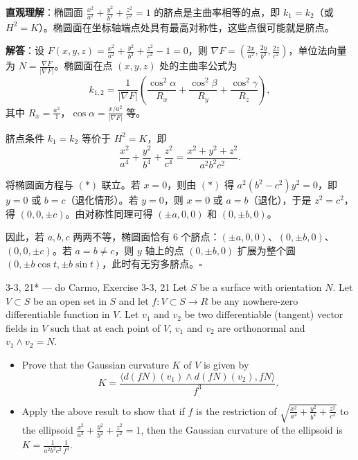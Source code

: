 \begin{solution}
\textbf{直观理解}：椭圆面 $\frac{x^2}{a^2}+\frac{y^2}{b^2}+\frac{z^2}{c^2}=1$ 的脐点是主曲率相等的点，即 $k_1=k_2$（或 $H^2=K$）。椭圆面在坐标轴端点处具有最高对称性，这些点很可能就是脐点。

\textbf{解答}：设 $F(x,y,z)=\frac{x^2}{a^2}+\frac{y^2}{b^2}+\frac{z^2}{c^2}-1=0$，则 $\nabla F=(\frac{2x}{a^2},\frac{2y}{b^2},\frac{2z}{c^2})$，单位法向量为 $N=\frac{\nabla F}{|\nabla F|}$。椭圆面在点 $(x,y,z)$ 处的主曲率公式为
\[
k_{1,2}=\frac{1}{|\nabla F|}\left(\frac{\cos^2\alpha}{R_x}+\frac{\cos^2\beta}{R_y}+\frac{\cos^2\gamma}{R_z}\right),
\]
其中 $R_x=\frac{a^2}{1}$，$\cos\alpha=\frac{x/a^2}{|\nabla F|}$ 等。

脐点条件 $k_1=k_2$ 等价于 $H^2=K$，即
\[
\frac{x^2}{a^4}+\frac{y^2}{b^4}+\frac{z^2}{c^4}=\frac{x^2+y^2+z^2}{a^2b^2c^2}. \tag{$*$}
\]

将椭圆面方程与 $(*)$ 联立。若 $x=0$，则由 $(*)$ 得 $a^2(b^2-c^2)y^2=0$，即 $y=0$ 或 $b=c$（退化情形）。若 $y=0$，则 $x=0$ 或 $a=b$（退化），于是 $z^2=c^2$，得 $(0,0,\pm c)$。由对称性同理可得 $(\pm a,0,0)$ 和 $(0,\pm b,0)$。

因此，若 $a,b,c$ 两两不等，椭圆面恰有 6 个脐点：$(\pm a,0,0)$、$(0,\pm b,0)$、$(0,0,\pm c)$。若 $a=b\neq c$，则 $y$ 轴上的点 $(0,\pm b,0)$ 扩展为整个圆 $(0,\pm b\cos t, \pm b\sin t)$，此时有无穷多脐点。$\square$
\end{solution}

\begin{exercise}{3-3, 21* — do Carmo, Exercise 3-3, 21}
Let $S$ be a surface with orientation $N$. Let $V \subset S$ be an open set in $S$ and let $f \colon V \subset S \to R$ be any nowhere-zero differentiable function in $V$. Let $v_{1}$ and $v_{2}$ be two differentiable (tangent) vector fields in $V$ such that at each point of $V$, $v_{1}$ and $v_{2}$ are orthonormal and $v_{1} \wedge v_{2} = N$.
\begin{itemize}
\item[a.] Prove that the Gaussian curvature $K$ of $V$ is given by
\[
K = \frac {\langle d (f N) (v _ {1}) \wedge d (f N) (v _ {2}) , f N \rangle}{f ^ {3}}.
\]
\item[b.] Apply the above result to show that if $f$ is the restriction of $\sqrt {\frac {x ^ {2}}{a ^ {4}} + \frac {y ^ {2}}{b ^ {4}} + \frac {z ^ {2}}{c ^ {4}}}$ to the ellipsoid $\frac {x ^ {2}}{a ^ {2}} + \frac {y ^ {2}}{b ^ {2}} + \frac {z ^ {2}}{c ^ {2}} = 1$, then the Gaussian curvature of the ellipsoid is $K = \frac {1}{a ^ {2} b ^ {2} c ^ {2}} \frac {1}{f ^ {4}}$.
\end{itemize}
\end{exercise}

